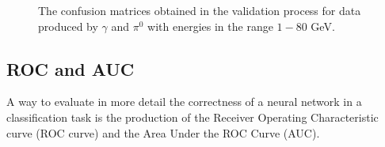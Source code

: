 \begin{figure}
	\centering
	 \quad
	\caption{The confusion matrices obtained in the validation process for data produced by $\gamma$ and $\pi^0$ with energies in the range $1 - 80$ GeV.}
	\label{fig:CM_rangeE}
\end{figure}

\subsection*{ROC and AUC}
A way to evaluate in more detail the correctness of a neural network in a classification task is the production of the Receiver Operating Characteristic curve (ROC curve) and the Area Under the ROC Curve (AUC).\\

